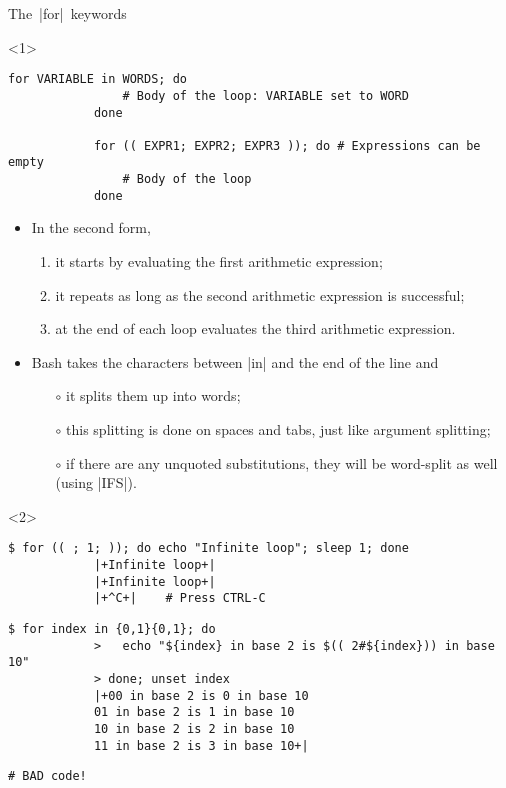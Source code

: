 \begin{frame}[fragile]{The \,\bash|for|\, keywords}
    \begin{onlyenv}<1>
        \begin{lstlisting}[style=MyBash, numbers=none, xrightmargin=4mm, xleftmargin=4mm]
            for VARIABLE in WORDS; do
                # Body of the loop: VARIABLE set to WORD
            done

            for (( EXPR1; EXPR2; EXPR3 )); do # Expressions can be empty
                # Body of the loop
            done
        \end{lstlisting}
        \bigskip
        \begin{itemize}
            \item In the second form,
                  \begin{enumerate}
                      \item it starts by evaluating the first arithmetic expression;
                      \item it repeats as long as the second arithmetic expression is successful;
                      \item at the end of each loop evaluates the third arithmetic expression.
                  \end{enumerate}
            \item Bash takes the characters between \bash|in| and the end of the line and
                  \begin{itemize}
                      \item[$\circ$] it splits them up into words;
                      \item[$\circ$] this splitting is done on spaces and tabs, just like argument splitting;
                      \item[$\circ$] if there are any unquoted substitutions, \alert{they will be word-split as well} (using \bash|IFS|).
                  \end{itemize}
        \end{itemize}
    \end{onlyenv}
    \begin{onlyenv}<2>
        \begin{lstlisting}[style=MyBash, xrightmargin=4mm]
            $ for (( ; 1; )); do echo "Infinite loop"; sleep 1; done
            |+Infinite loop+|
            |+Infinite loop+|
            |+^C+|    # Press CTRL-C
        \end{lstlisting}
        \medskip
        \begin{lstlisting}[style=MyBash, xrightmargin=4mm]
            $ for index in {0,1}{0,1}; do
            >   echo "${index} in base 2 is $(( 2#${index})) in base 10"
            > done; unset index
            |+00 in base 2 is 0 in base 10
            01 in base 2 is 1 in base 10
            10 in base 2 is 2 in base 10
            11 in base 2 is 3 in base 10+|
        \end{lstlisting}
        \medskip
        \begin{lstlisting}[style=MyBash, xrightmargin=4mm]
            # BAD code!


\end{lstlisting}
\end{onlyenv}
\end{frame}
